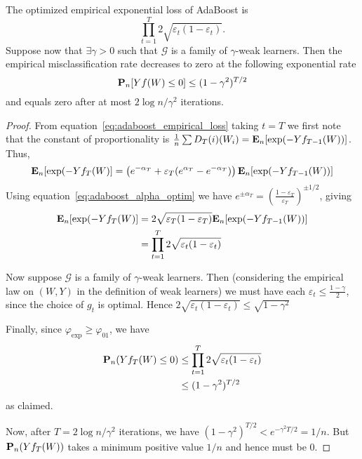 \begin{theorem}
The optimized empirical exponential loss of AdaBoost is 
\begin{equation*}
	\prod_{t=1}^T 2 \sqrt{\varepsilon_t (1 - \varepsilon_t)}.
\end{equation*}
Suppose now that $\exists \gamma > 0$ such that $\mathcal{G}$ is a family of $\gamma$-weak learners. Then the empirical misclassification rate decreases to zero at the following exponential rate
\begin{equation*}
	\mathbf{P}_n [Yf(W) \le 0] \le (1 - \gamma^2)^{T/2}
\end{equation*}
and equals zero after at most $2\log n/\gamma^2$ iterations.

\begin{proof}
From equation~\eqref{eq:adaboost_empirical_loss} taking $t=T$ we first note that the constant of proportionality is $\frac{1}{n}\sum D_T(i)(W_i) = \mathbf{E}_n [\exp(-Yf_{T-1}(W))]$. Thus,
\begin{equation*}
	\E_n[\exp(-Yf_T(W)] = \left( e^{-\alpha_T} + \varepsilon_T(e^{\alpha_T} - e^{-\alpha_T}) \right) \E_n [\exp(-Yf_{T-1}(W))] \\
\end{equation*}
Using equation~\eqref{eq:adaboost_alpha_optim} we have $e^{\pm \alpha_T} = \left(\frac{1 - \varepsilon_T}{\varepsilon_T}\right)^{\pm 1/2}$, giving
\begin{align*}
	\E_n[\exp(-Yf_T(W)] &= 2\sqrt{\varepsilon_T (1-\varepsilon_T)} \E_n [\exp(-Yf_{T-1}(W))] \\
	&= \prod_{t=1}^T 2\sqrt{\varepsilon_t (1-\varepsilon_t)} 
\end{align*}

Now suppose $\mathcal{G}$ is a family of $\gamma$-weak learners. Then (considering the empirical law on $(W, Y)$ in the definition of weak learners) we must have each $\varepsilon_t \le \frac{1 - \gamma}{2}$, since the choice of $g_t$ is optimal. Hence $2\sqrt{\varepsilon_t(1 - \varepsilon_t)} \le \sqrt{1 - \gamma^2}$

Finally, since $\varphi_\text{exp} \ge \varphi_{01}$, we have
\begin{align*}
	\Prob_n(Yf_T(W) \le 0) &\le \prod_{t=1}^T 2\sqrt{\varepsilon_t (1-\varepsilon_t)} \\
	&\le (1 - \gamma^2)^{T/2}
\end{align*}
as claimed.

Now, after $T = 2\log n/\gamma^2$ iterations, we have $(1 - \gamma^2)^{T/2} < e^{-\gamma^2 T/2} = 1/n$. But $\mathbf{P} _n(Yf_T(W))$ takes a minimum positive value $1/n$ and hence must be $0$.

\end{proof}
\end{theorem}


